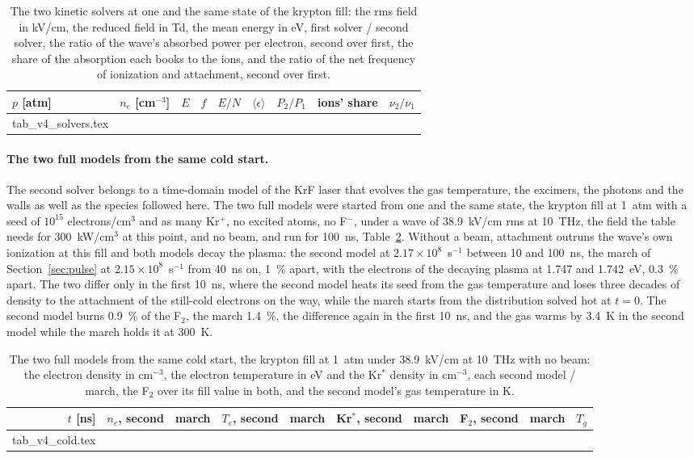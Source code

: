 \documentclass[11pt]{article}
\makeatletter
\newcommand{\tabinput}[1]{\@@input #1 }
\makeatother
\begin{document}
\begin{table}[!tbp]
\caption{The two kinetic solvers at one and the same state of the krypton fill: the rms field in kV/cm, the
reduced field in Td, the mean energy in eV, first solver / second solver, the ratio of the wave's absorbed power
per electron, second over first, the share of the absorption each books to the ions, and the ratio of the net
frequency of ionization and attachment, second over first.}
\label{tab:solvers}
\centering
\small
\begin{tabular}{@{}llrlrlrlr@{}}
\toprule
$p$ [atm] & $n_e$ [cm$^{-3}$] & $E$ & $f$ & $E/N$ & $\langle\epsilon\rangle$ & $P_2/P_1$ & ions' share & $\nu_2/\nu_1$ \\
\midrule
\tabinput{tab_v4_solvers.tex}
\bottomrule
\end{tabular}
\end{table}

\paragraph{The two full models from the same cold start.}
The second solver belongs to a time-domain model of the KrF laser that evolves the gas temperature, the excimers,
the photons and the walls as well as the species followed here. The two full models were started from one and the
same state, the krypton fill at 1~atm with a seed of $10^{15}$ electrons/cm$^3$ and as many Kr$^+$, no excited
atoms, no F$^-$, under a wave of 38.9~kV/cm rms at 10~THz, the field the table needs for 300~kW/cm$^3$ at this
point, and no beam, and run for 100~ns, Table~\ref{tab:cold}. Without a beam, attachment outruns the wave's own
ionization at this fill and both models decay the plasma: the second model at $2.17\times10^{8}$~s$^{-1}$ between 10
and 100~ns, the march of Section~\ref{sec:pulse} at $2.15\times10^{8}$~s$^{-1}$ from 40~ns on, 1~\% apart, with the
electrons of the decaying plasma at 1.747 and 1.742~eV, 0.3~\% apart. The two differ only in the first 10~ns, where
the second model heats its seed from the gas temperature and loses three decades of density to the attachment of
the still-cold electrons on the way, while the march starts from the distribution solved hot at $t=0$. The second
model burns 0.9~\% of the F$_2$, the march 1.4~\%, the difference again in the first 10~ns, and the gas warms by
3.4~K in the second model while the march holds it at 300~K.

\begin{table}[!tbp]
\caption{The two full models from the same cold start, the krypton fill at 1~atm under 38.9~kV/cm at 10~THz with
no beam: the electron density in cm$^{-3}$, the electron temperature in eV and the Kr$^*$ density in cm$^{-3}$,
each second model / march, the F$_2$ over its fill value in both, and the second model's gas temperature in K.}
\label{tab:cold}
\centering
\small
\begin{tabular}{@{}rrrrrrrrrr@{}}
\toprule
$t$ [ns] & $n_e$, second & march & $T_e$, second & march & Kr$^*$, second & march & F$_2$, second & march & $T_g$ \\
\midrule
\tabinput{tab_v4_cold.tex}
\bottomrule
\end{tabular}
\end{table}
\end{document}
